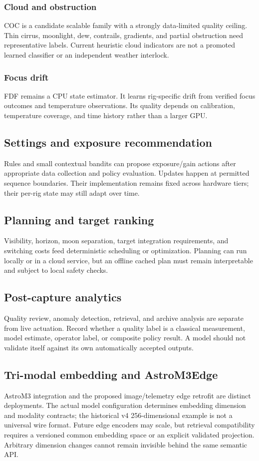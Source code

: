 \documentclass[11pt,a4paper]{article}
\begin{document}
\subsubsection{Cloud and obstruction}
COC is a candidate scalable family with a strongly data-limited quality ceiling.
Thin cirrus, moonlight, dew, contrails, gradients, and partial obstruction need
representative labels. Current heuristic cloud indicators are not a promoted
learned classifier or an independent weather interlock.

\subsubsection{Focus drift}
FDF remains a CPU state estimator. It learns rig-specific drift from verified
focus outcomes and temperature observations. Its quality depends on calibration,
temperature coverage, and time history rather than a larger GPU.

\subsection{Settings and exposure recommendation}
Rules and small contextual bandits can propose exposure/gain actions after
appropriate data collection and policy evaluation. Updates happen at permitted
sequence boundaries. Their implementation remains fixed across hardware tiers;
their per-rig state may still adapt over time.

\subsection{Planning and target ranking}
Visibility, horizon, moon separation, target integration requirements, and
switching costs feed deterministic scheduling or optimization. Planning can
run locally or in a cloud service, but an offline cached plan must remain
interpretable and subject to local safety checks.

\subsection{Post-capture analytics}
Quality review, anomaly detection, retrieval, and archive analysis are separate
from live actuation. Record whether a quality label is a classical measurement,
model estimate, operator label, or composite policy result. A model should not
validate itself against its own automatically accepted outputs.

\subsection{Tri-modal embedding and AstroM3Edge}
AstroM3 integration and the proposed image/telemetry edge retrofit are distinct
deployments. The actual model configuration determines embedding dimension and
modality contracts; the historical v4 256-dimensional example is not a universal
wire format. Future edge encoders may scale, but retrieval compatibility requires
a versioned common embedding space or an explicit validated projection. Arbitrary
dimension changes cannot remain invisible behind the same semantic API.
\end{document}
